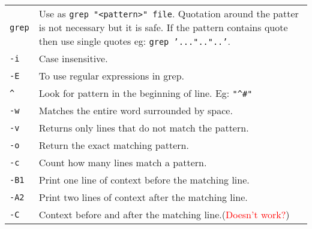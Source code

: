 \begin{tabularx}{\linewidth}{lX}
    \texttt{grep} & Use as \texttt{grep "<pattern>" file}. Quotation around the patter is not necessary but it is safe. If the pattern contains quote then use single quotes eg: \texttt{grep '...".."..'}.\\
    \texttt{-i} & Case insensitive.\\
    \texttt{-E} & To use regular expressions in grep.\\
    \texttt{\^} & Look for pattern in the beginning of line. Eg: \texttt{"\^{}\#"}\\
    \texttt{-w} & Matches the entire word surrounded by space.\\
    \texttt{-v} & Returns only lines that do not match the pattern.\\
    \texttt{-o} & Return the exact matching pattern.\\
    \texttt{-c} & Count how many lines match a pattern.\\
    \texttt{-B1} & Print one line of context before the matching line.\\
    \texttt{-A2} & Print two lines of context after the matching line.\\
    \texttt{-C} & Context before and after the matching line.(\textcolor{red}{Doesn't work?})\\
    \hline
\end{tabularx}

\vfill\null
\columnbreak

